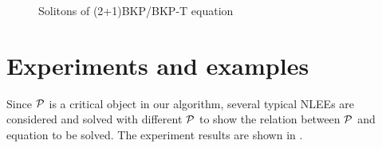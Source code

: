\begin{figure}[htbp]
\centering
{}
\caption{Solitons of (2+1)BKP/BKP-T equation}\label{bkp}
\end{figure}

\section{Experiments and examples}\label{Examples-01}
Since $\mathcal{P}$ is a critical object in our algorithm, several typical NLEEs are considered and solved with different $\mathcal{P}$ to show the relation between $\mathcal{P}$ and equation to be solved. The experiment results are shown in .

